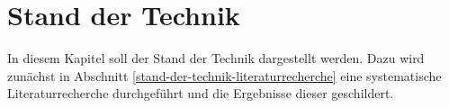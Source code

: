 \chapter{Stand der Technik} \label{stand-der-technik}

In diesem Kapitel soll der Stand der Technik dargestellt werden. Dazu wird zunächst in Abschnitt \ref{stand-der-technik-literaturrecherche} eine systematische Literaturrecherche durchgeführt und die Ergebnisse dieser geschildert.

